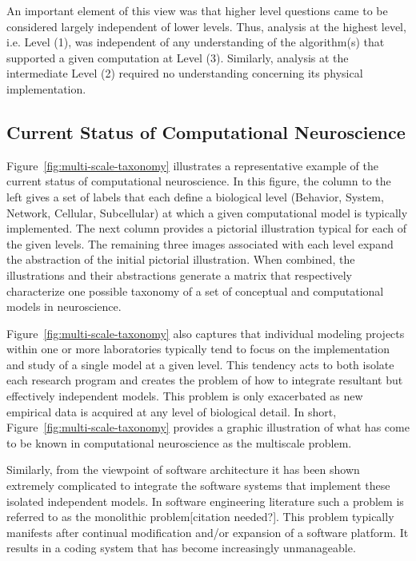\documentclass[11pt,3p,twocolumn]{JMN}
\begin{document}
An important element of this view was that higher level questions came to be considered largely independent of lower levels. Thus, analysis at the highest level, i.e. Level (1), was independent of any understanding of the algorithm(s) that supported a given computation at Level (3). Similarly, analysis at the intermediate Level (2) required no understanding concerning its physical implementation. 

\subsection{Current Status of Computational Neuroscience}

Figure~\ref{fig:multi-scale-taxonomy} illustrates a representative example of the current status of computational neuroscience. In this figure, the column to the left gives a set of labels that each define a biological level (Behavior, System, Network, Cellular, Subcellular) at which a given computational model is typically implemented. The next column provides a pictorial illustration typical for each of the given levels. The remaining three images associated with each level expand the abstraction of the initial pictorial illustration. When combined, the illustrations and their abstractions generate a matrix that respectively characterize one possible taxonomy of a set of conceptual and computational models in neuroscience.

Figure~\ref{fig:multi-scale-taxonomy} also captures that individual modeling projects within one or more laboratories typically tend to focus on the implementation and study of a single model at a given level. This tendency acts to both isolate each research program and creates the problem of how to integrate resultant but effectively independent models. This problem is only exacerbated as new empirical data is acquired at any level of biological detail.
In short, Figure~\ref{fig:multi-scale-taxonomy} provides a graphic illustration of what has come to be known in computational neuroscience as the multiscale problem.

Similarly, from the viewpoint of software architecture it has been shown extremely complicated to integrate the software systems that implement these isolated independent models.  In software engineering literature such a problem is referred to as the monolithic problem[citation needed?].
This problem typically manifests after continual modification and/or expansion of a software platform.  It results in a coding system that has become increasingly unmanageable.
\end{document}
